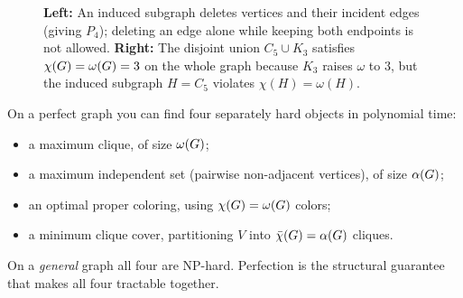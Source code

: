 \begin{figure}[htbp]
\caption{\textbf{Left:} An induced subgraph deletes vertices and their incident edges (giving $P_4$); deleting an edge alone while keeping both endpoints is not allowed. \textbf{Right:} The disjoint union $C_5 \cup K_3$ satisfies $\chi(G)=\omega(G)=3$ on the whole graph because $K_3$ raises $\omega$ to $3$, but the induced subgraph $H=C_5$ violates $\chi(H)=\omega(H)$.}
\label{ch30:fig-induced-trap}
\end{figure}

\begin{focusbox}
On a perfect graph you can find four separately hard objects in polynomial time:
\begin{itemize}
  \item a maximum clique, of size $\omega(G)$;
  \item a maximum independent set (pairwise non-adjacent vertices), of size $\alpha(G)$;
  \item an optimal proper coloring, using $\chi(G)=\omega(G)$ colors;
  \item a minimum clique cover, partitioning $V$ into $\bar\chi(G)=\alpha(G)$ cliques.
\end{itemize}
On a \emph{general} graph all four are $\mathrm{NP}$-hard. Perfection is the structural guarantee that makes all four tractable together.
\end{focusbox}

